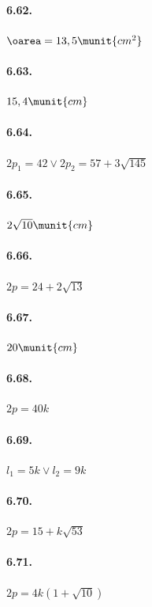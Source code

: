 \paragraph{6.62.}\(\oarea=13,5\munit{{cm}^2}\)

\paragraph{6.63.}\(15,4\munit{cm}\)

\paragraph{6.64.}\(2p_1=42\vee 2p_2=57+3\sqrt{145}\)

\paragraph{6.65.}\(2\sqrt{10}\munit{cm}\)

\paragraph{6.66.}\(2p=24+2\sqrt{13}\)

\paragraph{6.67.}\(20\munit{cm}\)

\paragraph{6.68.}\(2p=40k\)

\paragraph{6.69.}\(l_1=5k\vee l_2=9k\)

\paragraph{6.70.}\(2p=15+k\sqrt{53}\)

\paragraph{6.71.}\(2p=4k(1+\sqrt{10})\)


